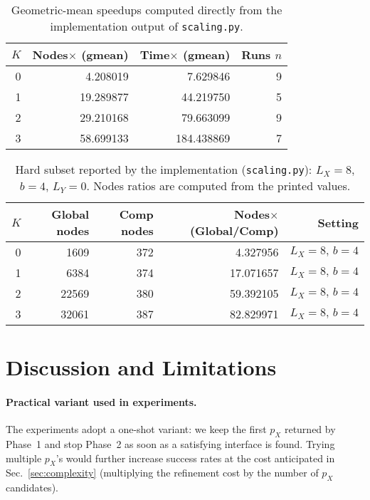 \documentclass[11pt]{article}
\begin{document}
\begin{table}[t]
\centering
\begin{tabular}{rrrr}
\hline
$K$ & Nodes$\times$ (gmean) & Time$\times$ (gmean) & Runs $n$ \\
\hline
0 & 4.208019 & 7.629846 & 9 \\
1 & 19.289877 & 44.219750 & 5 \\
2 & 29.210168 & 79.663099 & 9 \\
3 & 58.699133 & 184.438869 & 7 \\
\hline
\end{tabular}
\caption{Geometric-mean speedups computed directly from the implementation output of \texttt{scaling.py}.}
\label{tab:gm_by_k}
\end{table}




\begin{table}[t]
\centering
\begin{tabular}{rrrrr}
\hline
$K$ & Global nodes & Comp nodes & Nodes$\times$ (Global/Comp) & Setting \\
\hline
0 & 1609 & 372  & 4.327956 & $L_X{=}8,\,b{=}4$ \\
1 & 6384 & 374  & 17.071657 & $L_X{=}8,\,b{=}4$ \\
2 & 22569 & 380 & 59.392105 & $L_X{=}8,\,b{=}4$ \\
3 & 32061 & 387 & 82.829971 & $L_X{=}8,\,b{=}4$ \\
\hline
\end{tabular}
\caption{Hard subset reported by the implementation (\texttt{scaling.py}): $L_X{=}8$, $b{=}4$, $L_Y{=}0$. Nodes ratios are computed from the printed values.}
\label{tab:hard_subset}
\end{table}



\section{Discussion and Limitations}

\paragraph{Practical variant used in experiments.}
The experiments adopt a one-shot variant: we keep the first $p_X$ returned by Phase~1 and stop Phase~2 as soon as a satisfying interface is found. Trying multiple $p_X$'s would further increase success rates at the cost anticipated in Sec.~\ref{sec:complexity} (multiplying the refinement cost by the number of $p_X$ candidates).
\end{document}
